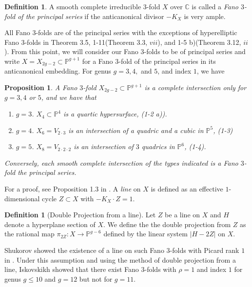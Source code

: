 \documentclass[11pt]{amsart}
\theoremstyle{plain}
\newtheorem{proposition}[theorem]{Proposition}
\theoremstyle{definition}
\newtheorem{definition}[theorem]{Definition}
\theoremstyle{expl}
\begin{document}
\begin{definition}
    A smooth complete irreducible $3$-fold $X$ over $\mathbb{C}$ is called a \textit{Fano $3$-fold of the principal series} if the anticanonical divisor $-K_X$ is very ample.
\end{definition}
All Fano $3$-folds are of the principal series with the exceptions of hyperelliptic Fano $3$-folds in Theorem 3.5, 1-11(Theorem 3.3, $vii$), and 1-5 b)(Theorem 3.12, $ii$).  From this point, we will consider our Fano $3$-folds to be of principal series and write $X = X_{2g-2} \subset \mathbb{P}^{g+1}$ for a Fano $3$-fold of the principal series in its anticanonical embedding.
For genus $g=3, 4,$ and $5$, and index $1$, we have 
\begin{proposition}
    A Fano $3$-fold $X_{2g-2}\subset \mathbb{P}^{g+1}$ is a complete intersection only for $g=3, 4$ or $5$, and we have that 
    \begin{enumerate}
    \item[(i)]$g=3$. $X_4 \subset \mathbb{P}^4$ is a quartic hypersurface, (1-2 a)).
    \item[(ii)]$g=4$. $X_6 = V_{2\cdot 3}$ is an intersection of a quadric and a cubic in $\mathbb{P}^5$, (1-3)
    \item[(iii)]$g=5$. $X_8 = V_{2\cdot 2\cdot 2}$ is an intersection of $3$ quadrics in $\mathbb{P}^6$, (1-4).
    \end{enumerate}
    Conversely, each smooth complete intersection of the types indicated is a Fano $3$-fold the principal series. 
\end{proposition}
For a proof, see Proposition 1.3 in \cite{Isk78}.
\medbreak
A \textit{line} on $X$ is defined as an effective $1$-dimensional cycle $Z \subset X$ with $-K_X \cdot Z=1$. 
\begin{definition}[Double Projection from a line]
Let $Z$ be a line on $X$ and $H$ denote a hyperplane section of $X$. We define the the double projection from $Z$ as the rational map $\pi_{2Z}: X \to \mathbb{P}^{g-6}$ defined by the linear system $|H-2Z|$ on $X$.
\end{definition}
Shukorov showed the existence of a line on such Fano $3$-folds with Picard rank $1$ in \cite{Sokuline}. Under this assumption and using the method of double projection from a line, Iskovskikh showed that there exist Fano $3$-folds with $\rho =1$ and index $1$ for genus $g \leq 10$ and $g=12$ but not for $g=11$.
 
\end{document}
